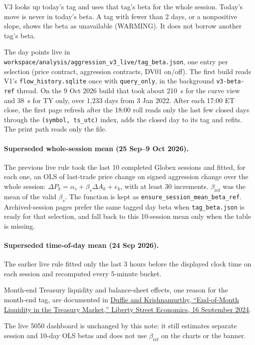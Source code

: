 \documentclass[11pt]{article}
\begin{document}
V3 looks up today's tag and uses that tag's beta for the whole session. Today's move is never in today's beta. A tag with fewer than 2 days, or a nonpositive slope, shows the beta as unavailable (WARMING). It does not borrow another tag's beta.

The day points live in \texttt{workspace/analysis/aggression\_v3\_live/tag\_beta.json}, one entry per selection (price contract, aggression contracts, DV01 on/off). The first build reads V1's \texttt{flow\_history.sqlite} once with \texttt{query\_only}, in the background \texttt{v3-beta-ref} thread. On the 9 Oct 2026 build that took about 210~s for the curve view and 38~s for TY only, over 1{,}233 days from 3 Jan 2022. After each 17:00 ET close, the first page refresh after the 18:00 roll reads only the last few closed days through the \texttt{(symbol, ts\_utc)} index, adds the closed day to its tag and refits. The print path reads only the file.

\paragraph{Superseded whole-session mean (25 Sep--9 Oct 2026).}
The previous live rule took the last 10 completed Globex sessions and fitted, for each one, an OLS of last-trade price change on signed aggression change over the whole session: $\Delta P_k=\alpha_s+\beta_s\Delta A_k+e_k$, with at least 30 increments. $\beta_{\mathrm{ref}}$ was the mean of the valid $\beta_s$. The function is kept as \texttt{ensure\_session\_mean\_beta\_ref}. Archived-session pages prefer the same tagged day beta when \texttt{tag\_beta.json} is ready for that selection, and fall back to this 10-session mean only when the table is missing.

\paragraph{Superseded time-of-day mean (24 Sep 2026).}
The earlier live rule fitted only the last 3 hours before the displayed clock time on each session and recomputed every 5-minute bucket.

Month-end Treasury liquidity and balance-sheet effects, one reason for the month-end tag, are documented in \href{https://libertystreeteconomics.newyorkfed.org/2024/09/end-of-month-liquidity-in-the-treasury-market/}{Duffie and Krishnamurthy, ``End-of-Month Liquidity in the Treasury Market,'' Liberty Street Economics, 16 September 2024}.

The live 5050 dashboard is unchanged by this note: it still estimates separate session and 10-day OLS betas and does not use $\beta_{\mathrm{ref}}$ on the charts or the banner.
\end{document}
